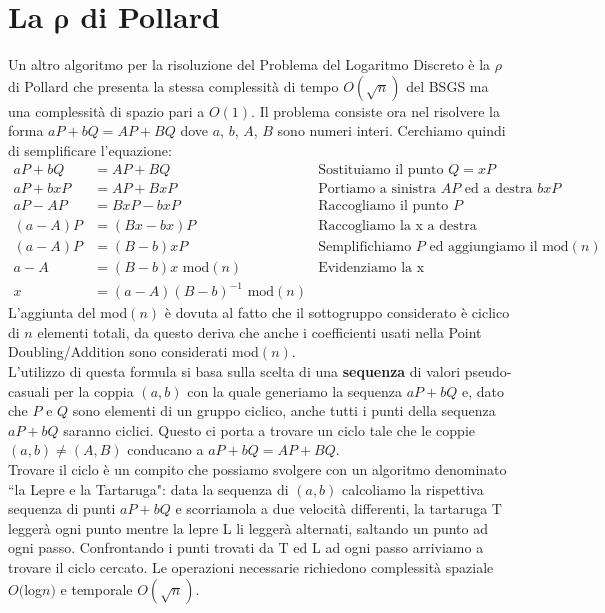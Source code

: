 \documentclass[a4paper,12pt]{tesiinfo}
\begin{document}
\section{La \texorpdfstring{$\mathbold{\rho}$}{p} di Pollard}
Un altro algoritmo per la risoluzione del Problema del Logaritmo Discreto \`e la $\rho$ di Pollard che presenta la stessa complessit\`a di tempo $O(\sqrt{n})$ del BSGS ma una complessit\`a di spazio pari a $O(1)$. Il problema consiste ora nel risolvere la forma $aP + bQ = AP + BQ$ dove $a$, $b$, $A$, $B$ sono numeri interi. Cerchiamo quindi di semplificare l'equazione:
\begin{align*}
 aP + bQ &= AP + BQ &\text{Sostituiamo il punto }Q = xP\\
 aP + bxP &= AP + BxP &\text{Portiamo a sinistra $AP$ ed a destra $bxP$}\\
 aP -AP &= BxP -bxP &\text{Raccogliamo il punto }P\\
 (a -A)P &= (Bx -bx)P &\text{Raccogliamo la x a destra}\\
 (a -A)P &= (B -b)xP &\text{Semplifichiamo $P$ ed aggiungiamo il mod$(n)$}\\
 a -A &= (B -b)x\text{ mod$(n)$} &\text{Evidenziamo la x}\\
 x &= (a -A)(B -b)^{-1}\text{ mod$(n)$}
\end{align*}
L'aggiunta del mod$(n)$ \`e dovuta al fatto che il sottogruppo considerato \`e ciclico di $n$ elementi totali, da questo deriva che anche i coefficienti usati nella Point Doubling/Addition sono considerati mod$(n)$.
\\
L'utilizzo di questa formula si basa sulla scelta di una \textbf{sequenza} di valori pseudo-casuali per la coppia $(a, b)$ con la quale generiamo la sequenza $aP+bQ$ e, dato che $P$ e $Q$ sono elementi di un gruppo ciclico, anche tutti i punti della sequenza $aP+bQ$ saranno ciclici. Questo ci porta a trovare un ciclo tale che le coppie $(a, b) \ne (A, B)$ conducano a $aP+bQ = AP+BQ$.
\\
Trovare il ciclo \`e un compito che possiamo svolgere con un algoritmo denominato ``la Lepre e la Tartaruga": data la sequenza di $(a, b)$ calcoliamo la rispettiva sequenza di punti $aP+bQ$ e scorriamola a due velocit\`a differenti, la tartaruga T legger\`a ogni punto mentre la lepre L li legger\`a alternati, saltando un punto ad ogni passo. Confrontando i punti trovati da T ed L ad ogni passo arriviamo a trovare il ciclo cercato. Le operazioni necessarie richiedono complessit\`a spaziale $O($log$n)$ e temporale $O(\sqrt{n})$.
\\
\end{document}

